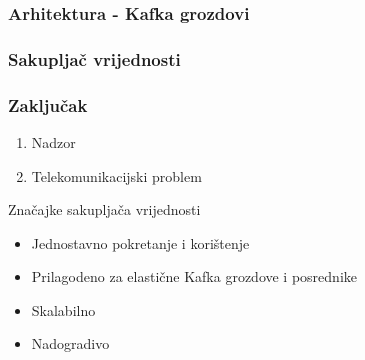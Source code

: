 \documentclass[usenames,dvipsnames]{beamer}
\begin{document}
\begin{frame}
\frametitle{Arhitektura - Kafka grozdovi}

\centering

\end{frame}

\begin{frame}
\frametitle{Sakupljač vrijednosti}

\hspace*{-4mm}

\end{frame}

\begin{frame}
\frametitle{Zaključak}

\begin{enumerate}
  \item Nadzor
  \item Telekomunikacijski problem
\end{enumerate}
\begin{block}{Značajke sakupljača vrijednosti}
\begin{itemize}
  \item Jednostavno pokretanje i korištenje
  \item Prilagodeno za elastične Kafka grozdove i posrednike
  \item Skalabilno
  \item Nadogradivo
\end{itemize}
\end{block}
\end{frame}
\end{document}
